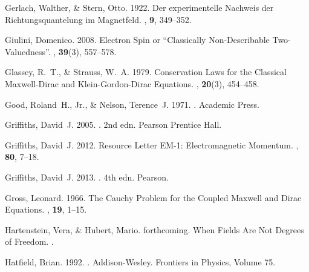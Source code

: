\documentclass[onecolumn,secnumarabic,amsmath,amssymb,balancelastpage,nofootinbib]{article}
\begin{document}
\begin{thebibliography}{}
Gerlach, Walther, \& Stern, Otto. 1922.
\newblock Der experimentelle Nachweis der Richtungsquantelung im Magnetfeld.
, {\bf 9}, 349--352.

Giulini, Domenico. 2008.
\newblock Electron Spin or ``Classically Non-Describable Two-Valuedness''.
, {\bf
  39}(3), 557--578.

Glassey, R.~T., \& Strauss, W.~A. 1979.
\newblock Conservation Laws for the Classical Maxwell-Dirac and
  Klein-Gordon-Dirac Equations.
, {\bf 20}(3), 454--458.

Good, Roland~H., Jr., \& Nelson, Terence~J. 1971.
.
\newblock Academic Press.

Griffiths, David~J. 2005.
. 2nd edn.
\newblock Pearson Prentice Hall.

Griffiths, David~J. 2012.
\newblock Resource Letter EM-1: Electromagnetic Momentum.
, {\bf 80}, 7--18.

Griffiths, David~J. 2013.
. 4th edn.
\newblock Pearson.

Gross, Leonard. 1966.
\newblock The Cauchy Problem for the Coupled Maxwell and Dirac Equations.
, {\bf 19},
  1--15.

Hartenstein, Vera, \& Hubert, Mario. forthcoming.
\newblock When Fields Are Not Degrees of Freedom.
.

Hatfield, Brian. 1992.
.
\newblock Addison-Wesley.
\newblock Frontiers in Physics, Volume 75.


\end{thebibliography}
\end{document}
